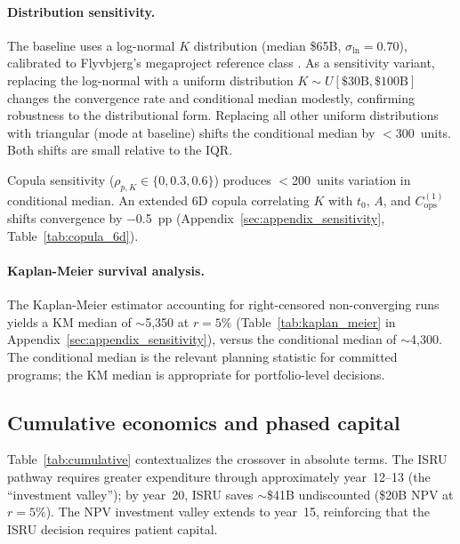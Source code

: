 \documentclass[preprint,12pt]{elsarticle}
\begin{document}
\paragraph{Distribution sensitivity.} The baseline uses a log-normal $K$ distribution (median \$65B, $\sigma_{\ln} = 0.70$), calibrated to Flyvbjerg's megaproject reference class \cite{flyvbjerg2014}. As a sensitivity variant, replacing the log-normal with a uniform distribution $K \sim U[\$30\text{B}, \$100\text{B}]$ changes the convergence rate and conditional median modestly, confirming robustness to the distributional form. Replacing all other uniform distributions with triangular (mode at baseline) shifts the conditional median by $<$300~units. Both shifts are small relative to the IQR.

Copula sensitivity ($\rho_{p,K} \in \{0, 0.3, 0.6\}$) produces $<$200~units variation in conditional median. An extended 6D copula correlating $K$ with $t_0$, $A$, and $C_{\mathrm{ops}}^{(1)}$ shifts convergence by $-$0.5~pp (Appendix~\ref{sec:appendix_sensitivity}, Table~\ref{tab:copula_6d}).

\paragraph{Kaplan-Meier survival analysis.} The Kaplan-Meier estimator \cite{kaplan1958} accounting for right-censored non-converging runs yields a KM median of $\sim$5{,}350 at $r = 5\%$ (Table~\ref{tab:kaplan_meier} in Appendix~\ref{sec:appendix_sensitivity}), versus the conditional median of $\sim$4{,}300. The conditional median is the relevant planning statistic for committed programs; the KM median is appropriate for portfolio-level decisions.

\subsection{Cumulative economics and phased capital}
\label{sec:phased_capital}

Table~\ref{tab:cumulative} contextualizes the crossover in absolute terms. The ISRU pathway requires greater expenditure through approximately year~12--13 (the ``investment valley''); by year~20, ISRU saves $\sim$\$41B undiscounted (\$20B NPV at $r = 5\%$). The NPV investment valley extends to year~15, reinforcing that the ISRU decision requires patient capital.
\end{document}

